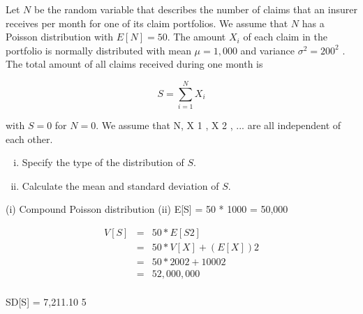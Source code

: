 \documentclass[a4paper,12pt]{article}
\begin{document}
Let $N$ be the random variable that describes the number of claims that an insurer receives per month for one of its claim portfolios. We assume that $N$ has a Poisson distribution with $E[N] = 50$. The amount $X_i$ of each claim in the portfolio is normally
distributed with mean $\mu = 1,000$ and variance $\sigma^2 = 200^2$ . The total amount of all
claims received during one month is

\[S = \sum^{N}_{i = 1} X_i\]

with $S = 0$ for $N = 0$. We assume that N, X 1 , X 2 , ... are all independent of each other.
\begin{enumerate}[(i)]
\item Specify the type of the distribution of $S$.
\item Calculate the mean and standard deviation of $S$.
\end{enumerate}


(i) Compound Poisson distribution
(ii)
E[S] = 50 * 1000 = 50,000

\begin{eqnarray*}
V[S] &=& 50 * E[S 2 ] \\ &=& 50 * {V[X] + (E[X]) 2 } \\ &=& 50 * {200 2 + 1000 2 } \\ &=&
52,000,000\\
\end{eqnarray*}


SD[S] = 7,211.10
5
\end{document}
